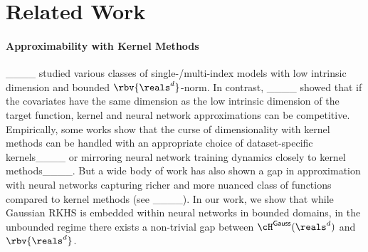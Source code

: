 \section{Related Work}
\paragraph{Approximability with Kernel Methods}

____ studied various classes of single-/multi-index models with low intrinsic dimension and bounded $\rbv{\reals^d}$-norm. In contrast, ____ showed that if the covariates have the same dimension as the low intrinsic dimension of the target function, kernel and neural network approximations can be competitive. Empirically, some works show that the curse of dimensionality with kernel methods can be handled with an appropriate choice of dataset-specific kernels____ or mirroring neural network training dynamics closely to kernel methods____. 
But a wide body of work has also shown a gap in approximation with neural networks capturing richer and more nuanced class of functions compared to kernel methods (see ____). In our work, we show that while Gaussian RKHS is embedded within neural networks in bounded domains, in the unbounded regime there exists a non-trivial gap between $\cH^{\sf{Gauss}}(\reals^d)$ and $\rbv{\reals^d}$.%


